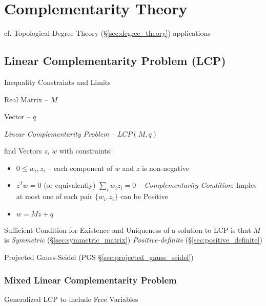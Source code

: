 \section{Complementarity Theory}\label{sec:complementarity_theory}

cf. Topological Degree Theory (\S\ref{sec:degree_theory}) applications



\subsection{Linear Complementarity Problem (LCP)}
\label{sec:linear_complementarity}


Inequality Constraints and Limits %

Real Matrix -- $M$

Vector -- $q$

\emph{Linear Complementarity Problem} -- $LCP(M,q)$

find Vectors $z$, $w$ with constraints:

\begin{itemize}
  \item $0 \leq w_i,z_i$ -- each component of $w$ and $z$ is
    non-negative
  \item $z^T w = 0$ (or equivalently) $\sum_i w_i z_i = 0$ --
    \emph{Complementarity Condition}: Imples at most one of each pair
    $\{w_i,z_i\}$ can be Positive
  \item $w = M z + q$
\end{itemize}

Sufficient Condition for Existence and Uniqueness of a solution to LCP
is that $M$ is \emph{Symmetric} (\S\ref{sec:symmetric_matrix})
\emph{Positive-definite} (\S\ref{sec:positive_definite})

\fist Projected Gauss-Seidel (PGS \S\ref{sec:projected_gauss_seidel})



\subsubsection{Mixed Linear Complementarity Problem}\label{sec:mlcp}

Generalized LCP to include Free Variables



